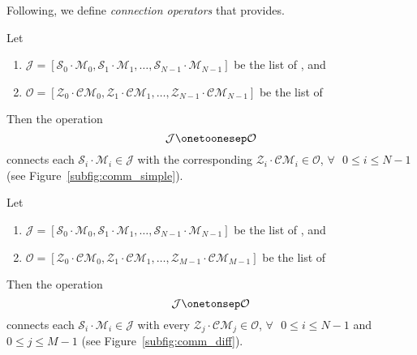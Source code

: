 
Following, we define \textit{connection operators} that \posl{} provides.

\begin{definition}\label{op_conn:1to1}
 Let 
\begin{enumerate}
\item $\mathcal{J} = \left[\mathcal{S}_0\cdot \mathcal{M}_0, \mathcal{S}_1\cdot \mathcal{M}_1,\dots, \mathcal{S}_{N-1}\cdot \mathcal{M}_{N-1}\right]$ be the list of \jacks, and
\item $\mathcal{O} = \left[\mathcal{Z}_0\cdot \mathcal{CM}_0, \mathcal{Z}_1\cdot \mathcal{CM}_1,\dots, \mathcal{Z}_{N-1}\cdot \mathcal{CM}_{N-1}\right]$ be the list of \outlets{}
\end{enumerate} Then the operation 
\[
\mathcal{J} \onetoonesep \mathcal{O}
\]
connects each \jack{} $\mathcal{S}_i\cdot \mathcal{M}_i \in \mathcal{J}$ with the corresponding \outlet{} $\mathcal{Z}_i\cdot \mathcal{CM}_i \in \mathcal{O}$, $\forall\textbf{ }0 \leq i \leq N-1$ (see Figure~\ref{subfig:comm_simple}).
\end{definition}

\separation

\begin{definition}\label{op_conn:1ton}
 Let 
\begin{enumerate} 
\item $\mathcal{J} = \left[\mathcal{S}_0\cdot \mathcal{M}_0, \mathcal{S}_1\cdot \mathcal{M}_1,\dots, \mathcal{S}_{N-1}\cdot \mathcal{M}_{N-1}\right]$ be the list of \jacks, and 
\item $\mathcal{O} = \left[\mathcal{Z}_0\cdot \mathcal{CM}_0, \mathcal{Z}_1\cdot \mathcal{CM}_1,\dots, \mathcal{Z}_{M-1}\cdot \mathcal{CM}_{M-1}\right]$ be the list of \outlets{} 
\end{enumerate} Then the operation 
\[
\mathcal{J} \onetonsep \mathcal{O}
\]
connects each \jack{} $\mathcal{S}_i\cdot \mathcal{M}_i \in \mathcal{J}$ with every \outlet{} $\mathcal{Z}_j\cdot \mathcal{CM}_j \in \mathcal{O}$, $\forall\textbf{ }0 \leq i \leq N-1$ and $0 \leq j \leq M-1$ (see Figure~\ref{subfig:comm_diff}).
\end{definition}

